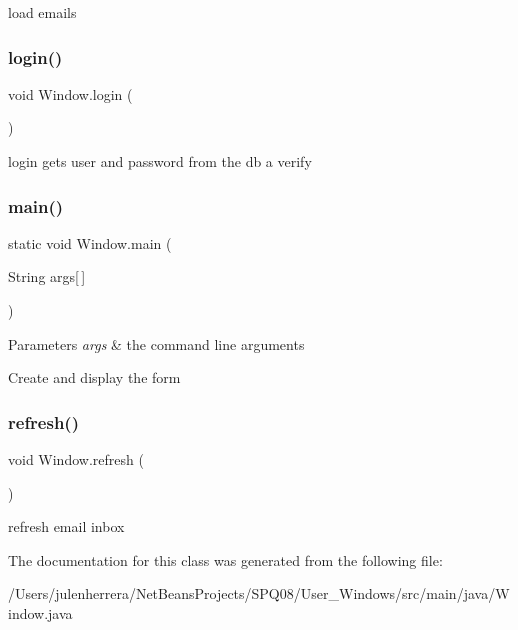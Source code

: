 load emails \mbox{\label{class_window_a0e9b9530fdbae1642ce5f2295160e1af}} 
\subsubsection{\texorpdfstring{login()}{login()}}
{\footnotesize\ttfamily void Window.\+login (\begin{DoxyParamCaption}{ }\end{DoxyParamCaption})}

login gets user and password from the db a verify \mbox{\label{class_window_a95602e95a687fa2069944650a01d780e}} 
\subsubsection{\texorpdfstring{main()}{main()}}
{\footnotesize\ttfamily static void Window.\+main (\begin{DoxyParamCaption}\item[{String}]{args\mbox{[}$\,$\mbox{]} }\end{DoxyParamCaption})\hspace{0.3cm}{\ttfamily [static]}}


\begin{DoxyParams}{Parameters}
{\em args} & the command line arguments \\
\hline
\end{DoxyParams}
Create and display the form \mbox{\label{class_window_ae0c2bf00a564beb8f03ee2ae97a4feb5}} 
\subsubsection{\texorpdfstring{refresh()}{refresh()}}
{\footnotesize\ttfamily void Window.\+refresh (\begin{DoxyParamCaption}{ }\end{DoxyParamCaption})}

refresh email inbox 

The documentation for this class was generated from the following file\+:\begin{DoxyCompactItemize}
\item 
/\+Users/julenherrera/\+Net\+Beans\+Projects/\+S\+P\+Q08/\+User\+\_\+\+Windows/src/main/java/Window.\+java\end{DoxyCompactItemize}
